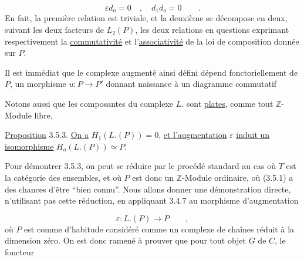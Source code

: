\begin{equation*}
\varepsilon d_o = 0 \quad , \quad d_1 d_o = 0 \qquad .
\end{equation*}
En fait, la première relation est triviale, et la deuxième se décompose en deux, suivant les deux facteurs de $L_2(P)$, les deux relations en questions exprimant respectivement la \underline{commutativité} et l'\underline{associativité} de la
loi de composition donnée sur $P$.

Il est immédiat que le complexe augmenté ainsi défini dépend fonctoriellement de $P$, un morphisme $u : P \longrightarrow P'$ donnant naissance à un diagramme commutatif

\begin{center}
\end{center}
Notons aussi que les composantes du complexe $L.$ sont \underline{plates}, comme tout $\mathbb{Z}$-Module libre.

\underline{Proposition} 3.5.3. \underline{On a} $H_1(L.(P))=0$, \underline{et l'augmentation} $\varepsilon$ \underline{induit un isomorphisme} $H_o(L.(P)) \simeq P$.

Pour démontrer 3.5.3, on peut se réduire par le procédé standard au cas où \underline{$T$} est la catégorie des ensembles, et où $P$ est donc un $\mathbb{Z}$-Module ordinaire, où (3.5.1) a des chances d'être ``bien connu''. Nous allons donner une démonstration directe, n'utilisant pas cette réduction, en appliquant 3.4.7 au morphisme d'augmentation

\begin{equation*}
\varepsilon : L.(P) \longrightarrow P \qquad ,
\end{equation*}
où $P$ est comme d'habitude considéré comme un complexe de chaînes réduit à la dimension zéro. On est donc ramené à prouver que pour tout objet $G$ de \underline{$C$}, le foncteur

